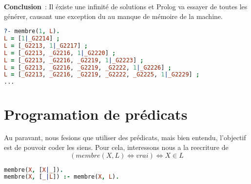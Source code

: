 \textbf{Conclusion}~: Il éxiste une infinité de solutions et Prolog va essayer
de toutes les générer, causant une exception du au manque de mémoire de la
machine.

\begin{lstlisting}[language=Prolog,frame=single]
?- membre(1, L).
L = [1|_G2214] ;
L = [_G2213, 1|_G2217] ;
L = [_G2213, _G2216, 1|_G2220] ;
L = [_G2213, _G2216, _G2219, 1|_G2223] ;
L = [_G2213, _G2216, _G2219, _G2222, 1|_G2226] ;
L = [_G2213, _G2216, _G2219, _G2222, _G2225, 1|_G2229] ;
...
\end{lstlisting}


\section{Programation de prédicats}

Au paravant, nous fesions que utiliser des prédicats, mais bien entendu,
l'objectif est de pouvoir coder les siens. Pour cela, interessons nous a la
reecriture de
\[(membre(X, L) \Leftrightarrow vrai) \Leftrightarrow X \in L\]

\begin{lstlisting}[language=Prolog,frame=single]
membre(X, [X|_]).
membre(X, [_|L]) :- membre(X, L).
\end{lstlisting}

